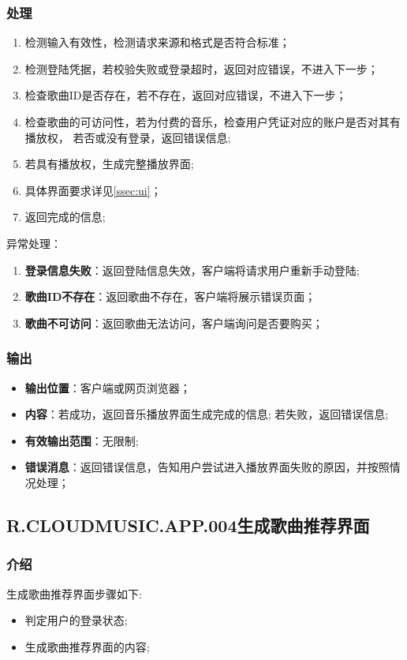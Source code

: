 \subsubsection{处理}
	\begin{enumerate}
		\item 检测输入有效性，检测请求来源和格式是否符合标准；
		\item 检测登陆凭据，若校验失败或登录超时，返回对应错误，不进入下一步；
		\item 检查歌曲ID是否存在，若不存在，返回对应错误，不进入下一步；
		\item 检查歌曲的可访问性，若为付费的音乐，检查用户凭证对应的账户是否对其有播放权，
			若否或没有登录，返回错误信息;
		\item 若具有播放权，生成完整播放界面;
		\item 具体界面要求详见\ref{ssec:ui}；
		\item 返回完成的信息;
	\end{enumerate}
	\noindent 异常处理：
	\begin{enumerate}
		\item \textbf{登录信息失败}：返回登陆信息失效，客户端将请求用户重新手动登陆;
		\item \textbf{歌曲ID不存在}：返回歌曲不存在，客户端将展示错误页面；
		\item \textbf{歌曲不可访问}：返回歌曲无法访问，客户端询问是否要购买；
	\end{enumerate}
\subsubsection{输出}
\begin{itemize}
	\item \textbf{输出位置}：客户端或网页浏览器；
	\item \textbf{内容}：若成功，返回音乐播放界面生成完成的信息; 若失败，返回错误信息;
	\item \textbf{有效输出范围}：无限制;
	\item \textbf{错误消息}：返回错误信息，告知用户尝试进入播放界面失败的原因，并按照情况处理；
\end{itemize}

\subsection{R.CLOUDMUSIC.APP.004生成歌曲推荐界面}
\subsubsection{介绍}
生成歌曲推荐界面步骤如下: 
	\begin{itemize}
		\item 判定用户的登录状态;
		\item 生成歌曲推荐界面的内容;
	\end{itemize}
